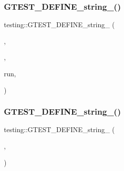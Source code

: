 \subsubsection{\texorpdfstring{G\+T\+E\+S\+T\+\_\+\+D\+E\+F\+I\+N\+E\+\_\+string\+\_\+()}{GTEST\_DEFINE\_string\_()}\hspace{0.1cm}{\footnotesize\ttfamily [3/5]}}
{\footnotesize\ttfamily testing\+::\+G\+T\+E\+S\+T\+\_\+\+D\+E\+F\+I\+N\+E\+\_\+string\+\_\+ (\begin{DoxyParamCaption}\item[{filter}]{,  }\item[{\hyperlink{namespacetesting_1_1internal_ac54dabc540bf79c2de91add679bfb93b}{internal\+::\+String\+From\+G\+Test\+Env}(\char`\"{}filter\char`\"{}, Get\+Default\+Filter())}]{,  }\item[{\char`\"{}A colon-\/separated list of glob (not regex) patterns \char`\"{} \char`\"{}for filtering the tests to}]{run,  }\item[{optionally followed by a \char`\"{} \char`\"{}\textquotesingle{}-\/\textquotesingle{} and a \+:separated list of negative patterns(tests to \char`\"{} \char`\"{}exclude). \hyperlink{namespacetesting_a5e9134d655d2fc9323902348083282e7}{A} test is run if it matches one of the positive \char`\"{} \char`\"{}patterns and does not match any of the negative patterns.\char`\"{}}]{ }\end{DoxyParamCaption})}

\mbox{\label{namespacetesting_a6f67b9169db6b5872f61d462b113cb85}} 
\subsubsection{\texorpdfstring{G\+T\+E\+S\+T\+\_\+\+D\+E\+F\+I\+N\+E\+\_\+string\+\_\+()}{GTEST\_DEFINE\_string\_()}\hspace{0.1cm}{\footnotesize\ttfamily [4/5]}}
{\footnotesize\ttfamily testing\+::\+G\+T\+E\+S\+T\+\_\+\+D\+E\+F\+I\+N\+E\+\_\+string\+\_\+ (\begin{DoxyParamCaption}\item[{output}]{,  }\item[{\hyperlink{namespacetesting_1_1internal_ac54dabc540bf79c2de91add679bfb93b}{internal\+::\+String\+From\+G\+Test\+Env}(\char`\"{}output\char`\"{}, \char`\"{}\char`\"{})}]{ }\end{DoxyParamCaption})}

